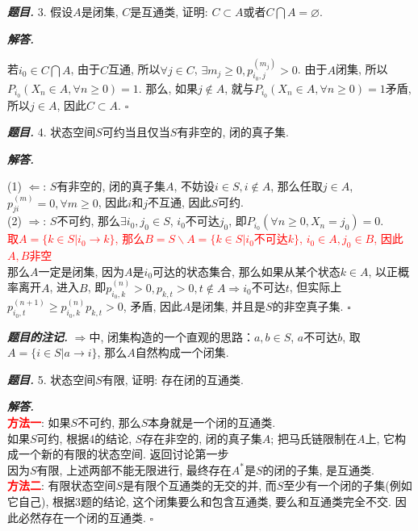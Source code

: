 \documentclass[10pt, a4paper, oneside]{ctexart}
\newenvironment{problem}{\begin{framed}\par\noindent\textbf{\textit{题目. }}}{\end{framed}\par}
\newenvironment{solution}{%
  \par\noindent\textbf{\textit{解答. }}\ignorespaces
}{%
  \hfill\ensuremath{\square}\par %
}
\newenvironment{note}{\par\noindent\textbf{\textit{题目的注记. }}\ignorespaces}{\par}
\begin{document}
\begin{problem}
    3. 假设$A$是闭集, $C$是互通类, 证明: $C\subset A$或者$C\bigcap A=\varnothing$.
\end{problem}
\begin{solution}
若$i_0\in C\bigcap A$, 由于$C$互通, 所以$\forall j\in C$, $\exists m_j\geq 0, p_{i_0,j}^{(m_j)}>0$. 由于$A$闭集, 所以$P_{i_0}(X_n\in A,\forall n\geq 0)=1$. 那么, 如果$j\notin A$, 就与$P_{i_0}(X_n\in A,\forall n\geq 0)=1$矛盾, 所以$j\in A$, 因此$C\subset A$.
\end{solution}

\begin{problem}
    4. 状态空间$S$可约当且仅当$S$有非空的, 闭的真子集.
\end{problem}
\begin{solution}
(1) $\Leftarrow$: $S$有非空的, 闭的真子集$A$, 不妨设$i\in S,i\notin A$, 那么任取$j\in A$, $p_{ji}^{(m)}=0,\forall m\geq 0$, 因此$i$和$j$不互通, 因此$S$可约.\\
(2) $\Rightarrow$: $S$不可约, 那么$\exists i_0,j_0\in S$, $i_0$不可达$j_0$, 即$P_{i_0}(\forall n\geq 0, X_n=j_0)=0$.\\ \textcolor{red}{取$A=\{k\in S|i_0\to k\}$, 那么$B=S\backslash A=\{k\in S|i_0\text{不可达} k\}$, $i_0\in A, j_0\in B$, 因此$A,B$非空}\\
那么$A$一定是闭集, 因为$A$是$i_0$可达的状态集合, 那么如果从某个状态$k\in A$, 以正概率离开$A$, 进入$B$, 即$p_{i_0,k}^{(n)}>0, p_{k,t}>0,t\notin A\Rightarrow i_0$不可达$t$, 但实际上$p_{i_0,t}^{(n+1)}\geq p_{i_0,k}^{(n)}p_{k,t}>0 $, 矛盾, 因此$A$是闭集, 并且是$S$的非空真子集. 
\end{solution}
\begin{note}
$\Rightarrow$中, 闭集构造的一个直观的思路：$a,b\in S$, $a$不可达$b$, 取$A=\{i\in S| a\to i\}$, 那么$A$自然构成一个闭集.
\end{note}

\begin{problem}
    5. 状态空间$S$有限, 证明: 存在闭的互通类.
\end{problem}
\begin{solution}\\
\textcolor{red}{\textbf{方法一}}: 如果$S$不可约, 那么$S$本身就是一个闭的互通类.\\
如果$S$可约, 根据4的结论, $S$存在非空的, 闭的真子集$A$; 把马氏链限制在$A$上, 它构成一个新的有限的状态空间. 返回讨论第一步\\
因为$S$有限, 上述两部不能无限进行, 最终存在$A^*$是$S$的闭的子集, 是互通类.\\
\textcolor{red}{\textbf{方法二}}: 有限状态空间$S$是有限个互通类的无交的并, 而$S$至少有一个闭的子集(例如它自己), 根据3题的结论, 这个闭集要么和包含互通类, 要么和互通类完全不交. 因此必然存在一个闭的互通类.
\end{solution}
\end{document}
